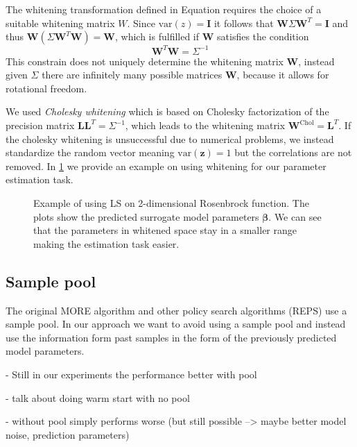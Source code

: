 The whitening transformation defined in Equation  requires
the choice of a suitable whitening matrix $W$.
Since $\text{var}(z) = \mathbf{I}$ it follows that
$\mathbf{W}\Sigma \mathbf{W}^T = \mathbf{I}$ and thus
$\mathbf{W}(\Sigma \mathbf{W}^T\mathbf{W}) = \mathbf{W}$, which
is fulfilled if $\mathbf{W}$ satisfies the condition
$$ \mathbf{W}^T \mathbf{W} = \Sigma^{-1} $$
This constrain does not uniquely determine the whitening
matrix $\mathbf{W}$, instead given $\Sigma$ there are infinitely many
possible matrices $\mathbf{W}$, because it allows for rotational freedom.

We used \textit{Cholesky whitening} which is based on
Cholesky factorization of the precision matrix
$\mathbf{L}\mathbf{L}^T = \Sigma^{-1}$, which leads to the whitening
matrix $\mathbf{W}^{\text{Chol}} = \mathbf{L}^T$.
If the cholesky whitening is unsuccessful due to numerical problems,
we instead standardize
the random vector meaning $\text{var}(\mathbf{z}) = 1$ but the correlations
are not removed. In \cref{fig:whitening} we provide an example on using
whitening for our parameter estimation task.

\begin{figure}[t]
  \centering
  \caption{Example of using LS on 2-dimensional
   Rosenbrock function. The plots show the predicted surrogate model
   parameters $\mathbf{\beta}$. We can see that
   the parameters in whitened space stay in a smaller range 
   making the estimation task easier.}
 \label{fig:whitening}
\end{figure}
  
\subsection{Sample pool}
The original MORE algorithm and other policy search algorithms (REPS)
use a sample pool.
In our approach  we want to avoid using a sample pool and instead use
the information form past samples in the form of the previously predicted
model parameters.

- Still in our experiments the performance better with pool

- talk about doing warm start with no pool

- without pool simply performs worse (but still possible --> maybe
better model noise, prediction parameters)

